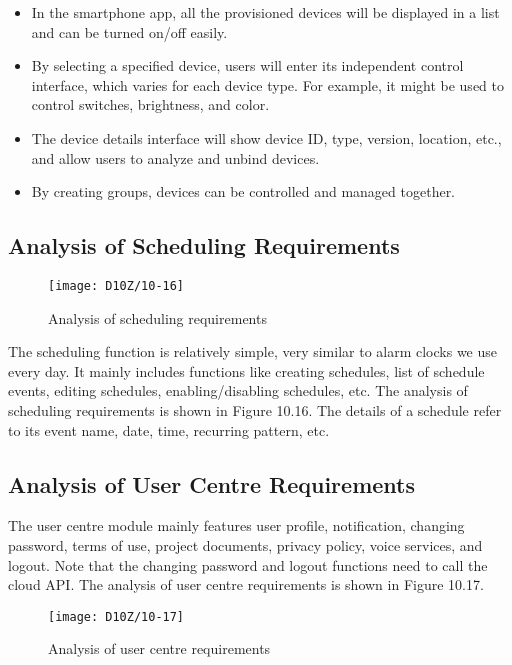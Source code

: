 \documentclass[a4paper,12pt]{book}
\begin{document}
\begin{itemize}
    \item In the smartphone app, all the provisioned devices will be displayed in a list and can be turned on/off easily.
    \item By selecting a specified device, users will enter its independent control interface, which varies for each device type. For example, it might be used to control switches, brightness, and color.
    \item The device details interface will show device ID, type, version, location, etc., and allow users to analyze and unbind devices.
    \item By creating groups, devices can be controlled and managed together.
\end{itemize}

\subsection{Analysis of Scheduling Requirements}
\begin{figure}[ht]
    \centering
    \texttt{[image: D10Z/10-16]}
    \caption{Analysis of scheduling requirements}
\end{figure}

The scheduling function is relatively simple, very similar to alarm clocks we use every day. It mainly includes functions like creating schedules, list of schedule events, editing schedules, enabling/disabling schedules, etc. The analysis of scheduling requirements is shown in Figure 10.16. The details of a schedule refer to its event name, date, time, recurring pattern, etc.

\subsection{Analysis of User Centre Requirements}
The user centre module mainly features user profile, notification, changing password, terms of use, project documents, privacy policy, voice services, and logout. Note that the changing password and logout functions need to call the cloud API. The analysis of user centre requirements is shown in Figure 10.17.

\begin{figure}[ht]
    \centering
    \texttt{[image: D10Z/10-17]}
    \caption{Analysis of user centre requirements}
\end{figure}
\end{document}
